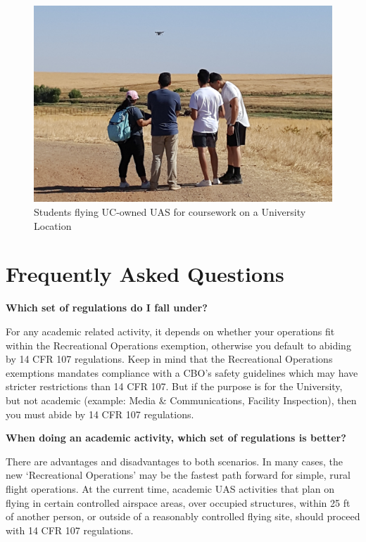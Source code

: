 \documentclass[
]{book}
\begin{document}
\begin{figure}

{\centering \includegraphics[width=0.7\linewidth]{images/students_flying} 

}

\caption{Students flying UC-owned UAS for coursework on a University Location}\label{fig:students-course}
\end{figure}

\hypertarget{frequently-asked-questions}{%
\section{Frequently Asked Questions}\label{frequently-asked-questions}}

\textbf{Which set of regulations do I fall under?}

For any academic related activity, it depends on whether your operations fit within the Recreational Operations exemption, otherwise you default to abiding by 14 CFR 107 regulations. Keep in mind that the Recreational Operations exemptions mandates compliance with a CBO's safety guidelines which may have stricter restrictions than 14 CFR 107. But if the purpose is for the University, but not academic (example: Media \& Communications, Facility Inspection), then you must abide by 14 CFR 107 regulations.

\textbf{When doing an academic activity, which set of regulations is better?}

There are advantages and disadvantages to both scenarios. In many cases, the new `Recreational Operations' may be the fastest path forward for simple, rural flight operations. At the current time, academic UAS activities that plan on flying in certain controlled airspace areas, over occupied structures, within 25 ft of another person, or outside of a reasonably controlled flying site, should proceed with 14 CFR 107 regulations.
\end{document}
